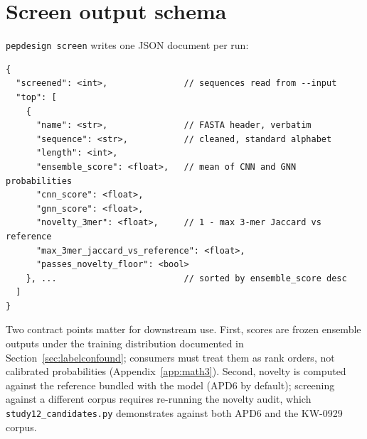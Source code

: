 
\section{Screen output schema}\label{app:schema}
\texttt{pepdesign screen} writes one JSON document per run:

\begin{verbatim}
{
  "screened": <int>,               // sequences read from --input
  "top": [
    {
      "name": <str>,               // FASTA header, verbatim
      "sequence": <str>,           // cleaned, standard alphabet
      "length": <int>,
      "ensemble_score": <float>,   // mean of CNN and GNN probabilities
      "cnn_score": <float>,
      "gnn_score": <float>,
      "novelty_3mer": <float>,     // 1 - max 3-mer Jaccard vs reference
      "max_3mer_jaccard_vs_reference": <float>,
      "passes_novelty_floor": <bool>
    }, ...                         // sorted by ensemble_score desc
  ]
}
\end{verbatim}

Two contract points matter for downstream use. First, scores are frozen
ensemble outputs under the training distribution documented in
Section~\ref{sec:labelconfound}; consumers must treat them as rank orders,
not calibrated probabilities (Appendix~\ref{app:math3}). Second, novelty
is computed against the reference bundled with the model (APD6 by
default); screening against a different corpus requires re-running the
novelty audit, which \texttt{study12\_candidates.py} demonstrates against
both APD6 and the KW-0929 corpus.
